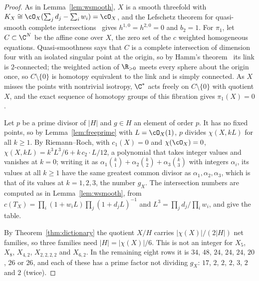 \begin{proof}
As in Lemma~\ref{lem:wsmooth}, $X$ is a smooth threefold with $K_X\cong
\cO_X(\sum_jd_j-\sum_iw_i)=\cO_X$, and the Lefschetz theorem for
quasi-smooth complete intersections~\cite{Dol82} gives $h^{1,0}=h^{2,0}=0$
and $b_2=1$. For $\pi_1$, let $C\subset\C^{N}$ be the affine cone over $X$,
the zero set of the $c$ weighted homogeneous equations. Quasi-smoothness
says that $C$ is a complete intersection of dimension four with an isolated
singular point at the origin, so by Hamm's theorem~\cite{Ham71} its link
is $2$-connected; the weighted action of $\R_{>0}$ meets every sphere about
the origin once, so $C\setminus\{0\}$ is homotopy equivalent to the link and
is simply connected. As $X$ misses the points with nontrivial isotropy,
$\C^*$ acts freely on $C\setminus\{0\}$ with quotient $X$, and the exact
sequence of homotopy groups of this fibration gives $\pi_1(X)=0$.

Let $p$ be a prime divisor of $|H|$ and $g\in H$ an element of order $p$.
It has no fixed points, so by Lemma~\ref{lem:freeprime} with
$L=\cO_X(1)$, $p$ divides $\chi(X,kL)$ for all $k\ge1$. By Riemann--Roch,
with $c_1(X)=0$ and $\chi(\cO_X)=0$,
$\chi(X,kL)=k^3L^3/6+k\,c_2\cdot L/12$, a polynomial that takes integer
values and vanishes at $k=0$; writing it as $\alpha_1\binom k1+\alpha_2
\binom k2+\alpha_3\binom k3$ with integers $\alpha_i$, its values at all
$k\ge1$ have the same greatest common divisor as $\alpha_1,\alpha_2,
\alpha_3$, which is that of its values at $k=1,2,3$, the number $g_X$. The
intersection numbers are computed as in Lemma~\ref{lem:wsmooth}, from
$c(T_X)=\prod_i(1+w_iL)\prod_j(1+d_jL)^{-1}$ and
$L^3=\prod_jd_j/\prod_iw_i$, and give the table.

By Theorem~\ref{thm:dictionary} the quotient $X/H$ carries
$|\chi(X)|/(2|H|)$ net families, so three families need
$|H|=|\chi(X)|/6$. This is not an integer for $X_5$, $X_8$, $X_{4,2}$,
$X_{2,2,2,2}$ and $X_{6,2}$. In the remaining eight rows it is $34$, $48$,
$24$, $24$, $24$, $20$, $26$ or $26$, and each of these has a prime factor
not dividing $g_X$: $17$, $2$, $2$, $2$, $3$, $2$ and $2$ (twice).
\end{proof}

